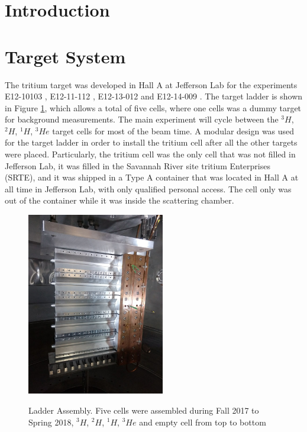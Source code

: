 \documentclass[preprint,12pt]{elsarticle}
\begin{document}

\section{Introduction}
\label{}

\section{Target System}


The tritium target was developed in Hall A at Jefferson Lab for the experiments E12-10103 \cite{marathon}, E12-11-112 \cite{E12-11-112}, E12-13-012 \cite{E12-13-012} and E12-14-009 \cite{E12-14-009}. The target ladder is shown in Figure \ref{ladder}, which allows a total of five cells, where one cells was a dummy target for background measurements. The main experiment will cycle between the $^{3}H$, $^{2}H$, $^{1}H $, $^{3}He$ target cells for most of the beam time. A modular design was used for the target ladder in order to install the tritium cell after all the other targets were placed. Particularly, the tritium cell was the only cell that was not filled in Jefferson Lab, it was filled in the Savannah River site tritium Enterprises (SRTE), and it was shipped in a Type A container that was located in Hall A at all time in Jefferson Lab, with only qualified personal access. The cell only was out of the container while it was inside the scattering chamber.

\begin{figure}
\centering
  \includegraphics[width=6cm]{images/ladder.jpg}\\
  \caption{Ladder Assembly. Five cells were assembled during Fall 2017 to Spring 2018, $^{3}H$, $^{2}H$, $^{1}H $, $^{3}He$ and empty cell from top to bottom
 }\label{ladder}
\end{figure}
\end{document}
